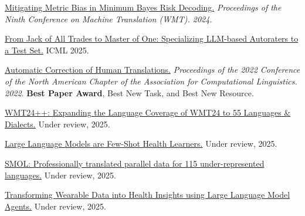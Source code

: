 
\href{https://aclanthology.org/2024.wmt-1.109.pdf}{Mitigating Metric Bias in Minimum Bayes Risk Decoding.} \emph{Proceedings of the Ninth Conference on Machine Translation (WMT). 2024.}

\href{https://arxiv.org/pdf/2411.15387}{From Jack of All Trades to Master of One: Specializing LLM-based Autoraters to a Test Set.} ICML 2025.

\href{https://aclanthology.org/2022.naacl-main.36.pdf}{Automatic Correction of Human Translations.} \emph{Proceedings of the 2022 Conference of the North American Chapter of the Association for Computational Linguistics. 2022}. \textbf{Best Paper Award}, Best New Task, and Best New Resource. %

\href{https://arxiv.org/pdf/2502.12404}{WMT24++: Expanding the Language Coverage of WMT24 to 55 Languages \& Dialects.} Under review, 2025.

\href{https://arxiv.org/pdf/2305.15525}{Large Language Models are Few-Shot Health Learners.} Under review, 2025.

\href{https://arxiv.org/pdf/2502.12301}{SMOL: Professionally translated parallel data for 115 under-represented languages.} Under review, 2025.

\href{https://arxiv.org/pdf/2406.06464}{Transforming Wearable Data into Health Insights using Large Language Model Agents.} Under review, 2025.

